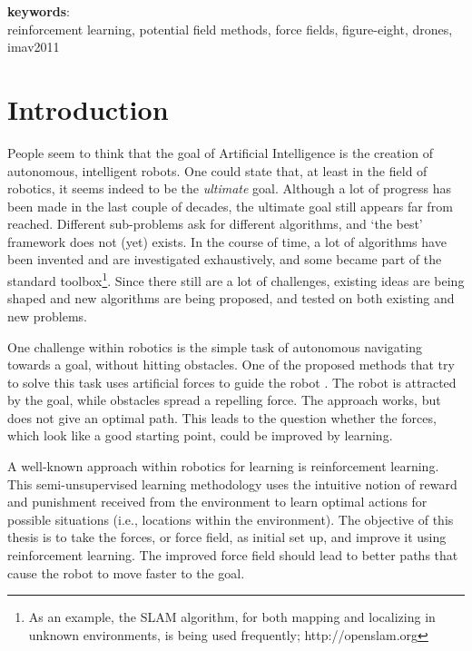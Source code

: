\documentclass[11pt]{article}
\begin{document}
\vspace{1cm}

\textbf{keywords}: \\
reinforcement learning, potential field methods, force fields, figure-eight, drones, imav2011
\pagebreak


\thispagestyle{empty} %
\tableofcontents
\pagebreak



\setcounter{page}{2}
\section{Introduction}
\label{sec:intro}


People seem to think that the goal of Artificial Intelligence is the creation of autonomous, intelligent robots. One could state that, at least in the field of robotics, it seems indeed to be the \emph{ultimate} goal. Although a lot of progress has been made in the last couple of decades, the ultimate goal still appears far from reached. Different sub-problems ask for different algorithms, and `the best' framework does not (yet) exists. In the course of time, a lot of algorithms have been invented and are investigated exhaustively, and some became part of the standard toolbox\footnote{As an example, the SLAM algorithm, for both mapping and localizing in unknown environments, is being used frequently; http://openslam.org}. Since there still are a lot of challenges, existing ideas are being shaped and new algorithms are being proposed, and tested on both existing and new problems.

One challenge within robotics is the simple task of autonomous navigating towards a goal, without hitting obstacles. One of the proposed methods that try to solve this task uses artificial forces to guide the robot \cite{choset}. The robot is attracted by the goal, while obstacles spread a repelling force. The approach works, but does not give an optimal path. This leads to the question whether the forces, which look like a good starting point, could be improved by learning.

A well-known approach within robotics for learning is reinforcement learning. This semi-unsupervised learning methodology uses the intuitive notion of reward and punishment received from the environment to learn optimal actions for possible situations (i.e., locations within the environment). The objective of this thesis is to take the forces, or force field, as initial set up, and improve it using reinforcement learning. The improved force field should lead to better paths that cause the robot to move faster to the goal.
\end{document}
